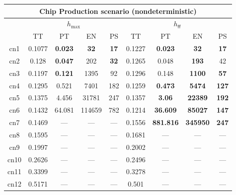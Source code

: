 \documentclass[landscape]{article}%
\begin{document}
%
\normalsize%
\begin{tabular}{||c||c|c|c|c|c|c|c|c||}%
\multicolumn{9}{c}{\textbf{Chip Production scenario (nondeterministic)}}\\%
\hline%
&\multicolumn{4}{||c||}{$h_{\max}$}&\multicolumn{4}{||c||}{$h_{\mathsf{ff}}$}\\%
\hline%
&\small{TT}&\small{PT}&\small{EN}&\small{PS}&\small{TT}&\small{PT}&\small{EN}&\small{PS}\\%
\hline%
\hline%
cn1&\small{0.1077}&\small{\textbf{0.023}}&\small{\textbf{32}}&\small{\textbf{17}}&\small{0.1227}&\small{\textbf{0.023}}&\small{\textbf{32}}&\small{\textbf{17}}\\%
\hline%
cn2&\small{0.128}&\small{\textbf{0.047}}&\small{202}&\small{\textbf{32}}&\small{0.1265}&\small{0.048}&\small{\textbf{193}}&\small{42}\\%
\hline%
cn3&\small{0.1197}&\small{\textbf{0.121}}&\small{1395}&\small{92}&\small{0.1296}&\small{0.148}&\small{\textbf{1100}}&\small{\textbf{57}}\\%
\hline%
cn4&\small{0.1295}&\small{0.521}&\small{7401}&\small{182}&\small{0.1259}&\small{\textbf{0.473}}&\small{\textbf{5474}}&\small{\textbf{127}}\\%
\hline%
cn5&\small{0.1375}&\small{4.456}&\small{31781}&\small{247}&\small{0.1357}&\small{\textbf{3.06}}&\small{\textbf{22389}}&\small{\textbf{192}}\\%
\hline%
cn6&\small{0.1432}&\small{64.081}&\small{114659}&\small{782}&\small{0.1214}&\small{\textbf{36.609}}&\small{\textbf{85027}}&\small{\textbf{147}}\\%
\hline%
cn7&\small{0.1469}&\small{---}&\small{---}&\small{---}&\small{0.1556}&\small{\textbf{881.816}}&\small{\textbf{345950}}&\small{\textbf{247}}\\%
\hline%
cn8&\small{0.1595}&\small{---}&\small{---}&\small{---}&\small{0.1681}&\small{---}&\small{---}&\small{---}\\%
\hline%
cn9&\small{0.1997}&\small{---}&\small{---}&\small{---}&\small{0.2002}&\small{---}&\small{---}&\small{---}\\%
\hline%
cn10&\small{0.2626}&\small{---}&\small{---}&\small{---}&\small{0.2496}&\small{---}&\small{---}&\small{---}\\%
\hline%
cn11&\small{0.3399}&\small{---}&\small{---}&\small{---}&\small{0.3278}&\small{---}&\small{---}&\small{---}\\%
\hline%
cn12&\small{0.5171}&\small{---}&\small{---}&\small{---}&\small{0.501}&\small{---}&\small{---}&\small{---}\\%
\hline%
\end{tabular}%
\end{document}
